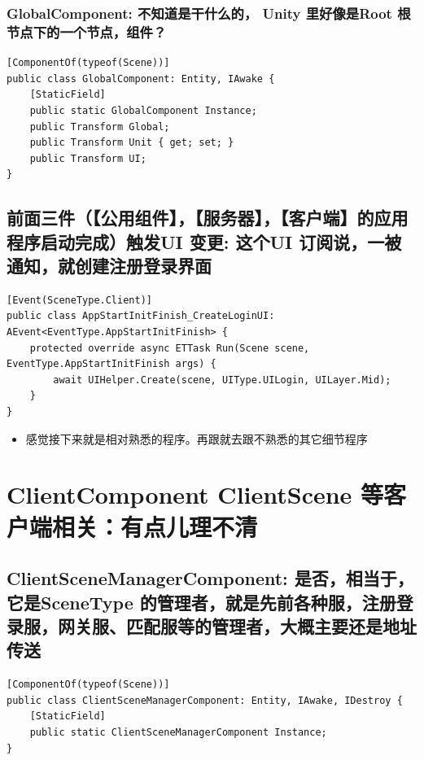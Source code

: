 \documentclass[9pt, b5paper]{article}
\begin{document}
\subsubsection{GlobalComponent: 不知道是干什么的， Unity 里好像是Root 根节点下的一个节点，组件？}
\label{sec-1-5-2}
\begin{verbatim}
[ComponentOf(typeof(Scene))]
public class GlobalComponent: Entity, IAwake {
    [StaticField]
    public static GlobalComponent Instance;
    public Transform Global;
    public Transform Unit { get; set; }
    public Transform UI;
}
\end{verbatim}
\subsection{前面三件（【公用组件】，【服务器】，【客户端】的应用程序启动完成）触发UI 变更: 这个UI 订阅说，一被通知，就创建注册登录界面}
\label{sec-1-6}
\begin{verbatim}
[Event(SceneType.Client)]
public class AppStartInitFinish_CreateLoginUI: AEvent<EventType.AppStartInitFinish> {
    protected override async ETTask Run(Scene scene, EventType.AppStartInitFinish args) {
        await UIHelper.Create(scene, UIType.UILogin, UILayer.Mid);
    }
}
\end{verbatim}
\begin{itemize}
\item 感觉接下来就是相对熟悉的程序。再跟就去跟不熟悉的其它细节程序
\end{itemize}

\section{ClientComponent ClientScene 等客户端相关：有点儿理不清}
\label{sec-2}

\subsection{ClientSceneManagerComponent: 是否，相当于，它是SceneType 的管理者，就是先前各种服，注册登录服，网关服、匹配服等的管理者，大概主要还是地址传送}
\label{sec-2-1}
\begin{verbatim}
[ComponentOf(typeof(Scene))]
public class ClientSceneManagerComponent: Entity, IAwake, IDestroy {
    [StaticField]
    public static ClientSceneManagerComponent Instance;
}
\end{verbatim}
\end{document}
